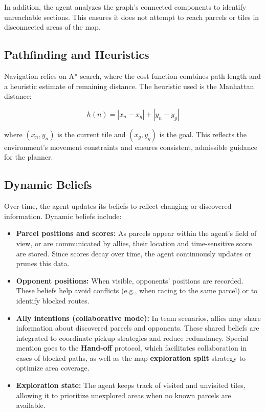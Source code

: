 \documentclass[conference]{IEEEtran}
\begin{document}
In addition, the agent analyzes the graph’s connected components to identify unreachable sections. This ensures it does not attempt to reach parcels or tiles in disconnected areas of the map.

\subsection{Pathfinding and Heuristics}

Navigation relies on A* search, where the cost function combines path length and a heuristic estimate of remaining distance. The heuristic used is the Manhattan distance:

\[
h(n) = |x_n - x_g| + |y_n - y_g|
\]

where $(x_n, y_n)$ is the current tile and $(x_g, y_g)$ is the goal. This reflects the environment’s movement constraints and ensures consistent, admissible guidance for the planner.

\subsection{Dynamic Beliefs}

Over time, the agent updates its beliefs to reflect changing or discovered information. Dynamic beliefs include:

\begin{itemize}
	\item \textbf{Parcel positions and scores:} As parcels appear within the agent’s field of view, or are communicated by allies, their location and time-sensitive score are stored. Since scores decay over time, the agent continuously updates or prunes this data.
	
	\item \textbf{Opponent positions:} When visible, opponents’ positions are recorded. These beliefs help avoid conflicts (e.g., when racing to the same parcel) or to identify blocked routes.
	
	\item \textbf{Ally intentions (collaborative mode):} In team scenarios, allies may share information about discovered parcels and opponents. These shared beliefs are integrated to coordinate pickup strategies and reduce redundancy. Special mention goes to the \textbf{Hand-off} protocol, which facilitates collaboration in cases of blocked paths, as well as the map \textbf{exploration split} strategy to optimize area coverage.

	
	\item \textbf{Exploration state:} The agent keeps track of visited and unvisited tiles, allowing it to prioritize unexplored areas when no known parcels are available.
\end{itemize}
\end{document}
